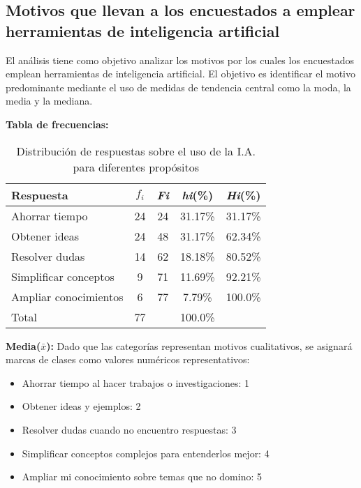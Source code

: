\subsection{Motivos que llevan a los encuestados a emplear herramientas de inteligencia artificial}
\vspace{-0.5cm}
El análisis tiene como objetivo analizar los motivos por los cuales los encuestados emplean herramientas de inteligencia artificial. El objetivo es identificar el motivo predominante mediante el uso de medidas de tendencia central como la moda, la media y la mediana.
\vspace{-0.5cm}

\textbf{Tabla de frecuencias:}
\begin{table}[H]
	\centering
	\renewcommand{\arraystretch}{1.1}
	\begin{tabular}{l c c c c}
		\hline
		{Respuesta} & {\(f_i\)} & \textit{Fi} & \textit{hi}(\%) & \textit{Hi}(\%)\\
		\hline
		Ahorrar tiempo        & 24 & 24 & 31.17\% & 31.17\%\\
		Obtener ideas         & 24 & 48 & 31.17\% & 62.34\%\\
		Resolver dudas        & 14 & 62 & 18.18\% & 80.52\%\\
		Simplificar conceptos & 9  & 71 & 11.69\% & 92.21\%\\
		Ampliar conocimientos & 6  & 77 & 7.79\%  & 100.0\%\\
		\hline
		Total                 & 77 &    & 100.0\%\\
		\hline
	\end{tabular}
	\caption{Distribución de respuestas sobre el uso de la I.A. para diferentes propósitos}
	\label{tabla:motivos}
\end{table}
\vspace{-0.8cm}
\textbf{Media($\bar{x}$):} Dado que las categorías representan motivos cualitativos, se asignará marcas de clases como valores numéricos representativos:
\vspace{-0.6cm}
\begin{itemize}
	\item Ahorrar tiempo al hacer trabajos o investigaciones: 1
	\vspace{-0.3cm}
	\item Obtener ideas y ejemplos: 2
	\vspace{-0.3cm}
	\item Resolver dudas cuando no encuentro respuestas: 3
	\vspace{-0.3cm}
	\item Simplificar conceptos complejos para entenderlos mejor: 4
	\vspace{-0.3cm}
	\item Ampliar mi conocimiento sobre temas que no domino: 5
\end{itemize}
